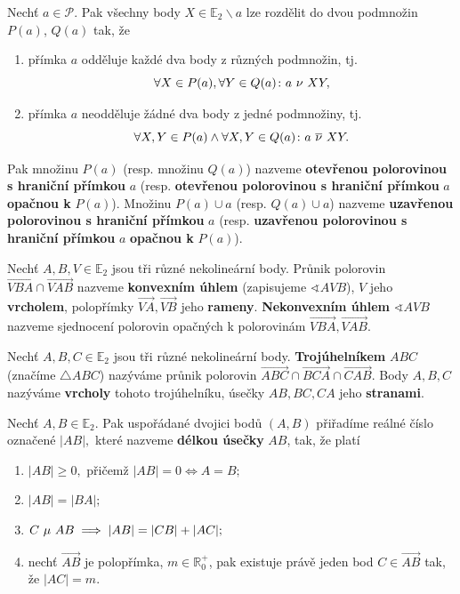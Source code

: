 \begin{definition}
  Nechť $a \in \mathscr P$. Pak všechny body $X\in \mathbb E_2 \smallsetminus a$ lze rozdělit do dvou
  podmnožin $P(a)$, $Q(a)$ tak, že
  \begin{enumerate}[$i.$]
    \item přímka $a$ odděluje každé dva body z různých podmnožin, tj.
      \[
        \forall X \in P(a), \forall Y \in Q(a)\colon a \operatorname{\,\nu\,} XY,
      \]
    \item přímka $a$ neodděluje žádné dva body z jedné podmnožiny, tj.
      \[
        \forall X, Y \in P(a) \land \forall X,Y \in Q(a)\colon a \operatorname{\,\overline{\nu}\,} XY.
      \]
  \end{enumerate}
  Pak množinu $P(a)$ (resp. množinu $Q(a)$) nazveme \textbf{otevřenou polorovinou s hraniční přímkou} $a$ (resp. \textbf{otevřenou polorovinou s hraniční přímkou} $a$ \textbf{opačnou k} $P(a)$). Množinu $P(a)\cup a$ (resp. $Q(a) \cup a$) nazveme \textbf{uzavřenou polorovinou s hraniční přímkou} $a$ (resp. \textbf{uzavřenou polorovinou s hraniční přímkou} $a$ \textbf{opačnou k} $P(a)$).
\end{definition}

\begin{definition}\label{uheldef}
  Nechť $A,B,V \in \mathbb E_2$ jsou tři různé nekolineární body. Průnik polorovin $\overrightarrow{VBA} \cap \overrightarrow{VAB}$ nazveme \textbf{konvexním úhlem}
  (zapisujeme $\sphericalangle AVB$), $V$ jeho \textbf{vrcholem}, polopřímky $\overrightarrow{VA}, \overrightarrow{VB}$ jeho \textbf{rameny}.
  \textbf{Nekonvexním úhlem} $\sphericalangle AVB$ nazveme sjednocení polorovin opačných k polorovinám $\overrightarrow{VBA},\overrightarrow{VAB}.$
\end{definition}

\begin{definition}
  Nechť $A,B,C\in \mathbb E_2$ jsou tři různé nekolineární body. \textbf{Trojúhelníkem} $ABC$ (značíme $\triangle ABC$) nazýváme průnik polorovin $\overrightarrow{ABC} \cap \overrightarrow{BCA} \cap \overrightarrow{CAB}$. Body $A,B,C$ nazýváme \textbf{vrcholy} tohoto trojúhelníku, úsečky $AB, BC, CA$ jeho \textbf{stranami}.
\end{definition}

\begin{definition}
  Nechť $A,B\in \mathbb E_2.$ Pak uspořádané dvojici bodů $(A,B)$ přiřadíme reálné číslo označené $|AB|,$ které nazveme \textbf{délkou úsečky} $AB$, tak, že platí
  \begin{enumerate}[$i.$]
    \item $|AB|\geq 0,$ přičemž $|AB|=0 \iff A=B;$
    \item $|AB|=|BA|;$
    \item $C \operatorname{\,\mu\,}  AB \implies |AB|=|CB|+|AC|;$
    \item nechť $\overrightarrow{AB}$ je polopřímka, $m\in \mathbb R^+_0$, pak existuje právě jeden bod $C\in \overrightarrow{AB}$ tak, že $|AC|=m.$
  \end{enumerate}
\end{definition}

